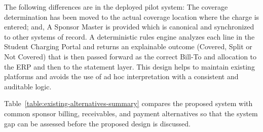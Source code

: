 The following differences are in the deployed pilot system: The coverage determination has been moved to the actual coverage location where the charge is entered; and, A Sponsor Master is provided which is canonical and synchronized to other systems of record. A deterministic rules engine analyzes each line in the Student Charging Portal and returns an explainable outcome (Covered, Split or Not Covered) that is then passed forward as the correct Bill-To and allocation to the ERP and then to the statement layer. This design helps to maintain existing platforms and avoids the use of ad hoc interpretation with a consistent and auditable logic.

\setlength{\LTleft}{0pt}
\setlength{\LTright}{\fill}
Table~\ref{table:existing-alternatives-summary} compares the proposed system with common sponsor billing, receivables, and payment alternatives so that the system gap can be assessed before the proposed design is discussed.

